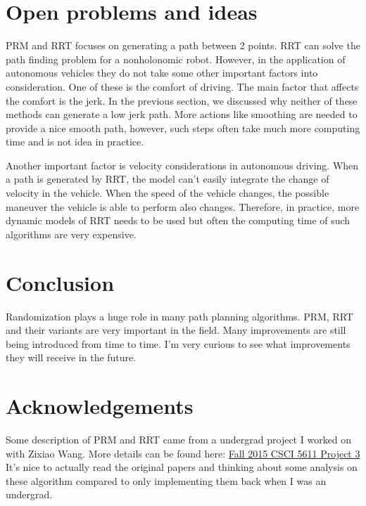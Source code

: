 \documentclass[12pt]{article}
\begin{document}
\section*{Open problems and ideas}
PRM and RRT focuses on generating a path between 2 points. RRT can solve the path finding problem for a nonholonomic robot. However, in the application of autonomous vehicles they do not take some other important factors into consideration. One of these is the comfort of driving. The main factor that affects the comfort is the jerk. In the previous section, we discussed why neither of these methods can generate a low jerk path. More actions like smoothing are needed to provide a nice smooth path, however, such steps often take much more computing time and is not idea in practice. 

Another important factor is velocity considerations in autonomous driving. When a path is generated by RRT, the model can't easily integrate the change of velocity in the vehicle. When the speed of the vehicle changes, the possible maneuver the vehicle is able to perform also changes. Therefore, in practice, more dynamic models of RRT needs to be used but often the computing time of such algorithms are very expensive. 

\section*{Conclusion}
Randomization plays a huge role in many path planning algorithms. PRM, RRT and their variants are very important in the field. Many improvements are still being introduced from time to time. I'm very curious to see what improvements they will receive in the future. 

\section*{Acknowledgements}
Some description of PRM and RRT came from a undergrad project I worked on with Zixiao Wang. More details can be found here: \href{https://cosmos-graphics.github.io/projects/project_3/index.html}{Fall 2015 CSCI 5611 Project 3} It's nice to actually read the original papers and thinking about some analysis on these algorithm compared to only implementing them back when I was an undergrad.








\end{document}
